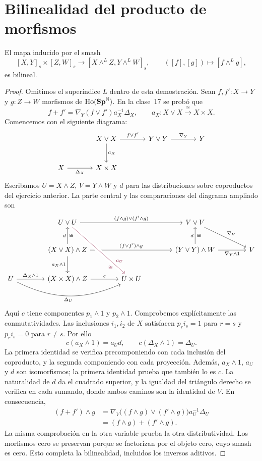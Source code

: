 \section{Bilinealidad del producto de morfismos}
\begin{prop}
El mapa inducido por el smash
\[
[X,Y]_s\times[Z,W]_s\longrightarrow[X\wedge^L Z,Y\wedge^L W]_s,
\qquad ([f],[g])\longmapsto[f\wedge^L g],
\]
es bilineal.
\end{prop}
\begin{proof}
Omitimos el superíndice $L$ dentro de esta demostración. Sean $f,f'\colon X\to Y$ y $g\colon Z\to W$ morfismos de $\operatorname{Ho}(\mathbf{Sp}^{\mathbb N})$. En la clase~17 se probó que
\[
f+f'=\nabla_Y(f\vee f')a_X^{-1}\Delta_X,
\qquad a_X\colon X\vee X\xrightarrow{\cong}X\times X.
\]
Comencemos con el siguiente diagrama:
\[
\begin{tikzcd}[column sep=large,row sep=large]
&X\vee X\arrow[r,"f\vee f'"]\arrow[d,"a_X"]&Y\vee Y\arrow[r,"\nabla_Y"]&Y\\
X\arrow[r,"\Delta_X"']&X\times X&&
\end{tikzcd}
\]
Escribamos $U=X\wedge Z$, $V=Y\wedge W$ y $d$ para las distribuciones sobre coproductos del ejercicio anterior. La parte central y las comparaciones del diagrama ampliado son
\[
\begin{tikzcd}[column sep=4em,row sep=2.4em]
&U\vee U\arrow[rr,"(f\wedge g)\vee(f'\wedge g)"]&&V\vee V\arrow[dr,"\nabla_V"]&\\
&(X\vee X)\wedge Z\arrow[u,"d","\cong"']\arrow[rr,"(f\vee f')\wedge g"]\arrow[d,"a_X\wedge1"']
&&(Y\vee Y)\wedge W\arrow[u,"d","\cong"']\arrow[r,"\nabla_Y\wedge1"']&V\\
U\arrow[r,"\Delta_X\wedge1"]\arrow[rr,bend right=25,"\Delta_U"']&(X\times X)\wedge Z\arrow[r,"c"]&U\times U&&
\arrow[from=1-2,to=3-3,rojoDiagramaCIMAT,"a_U"{pos=.8},"\cong"'{pos=.8},crossing over]
\end{tikzcd}
\]
Aquí $c$ tiene componentes $p_1\wedge1$ y $p_2\wedge1$. Comprobemos explícitamente las conmutatividades. Las inclusiones $i_1,i_2$ de $X$ satisfacen $p_ri_s=1$ para $r=s$ y $p_ri_s=0$ para $r\ne s$. Por ello
\[
c(a_X\wedge1)=a_Ud,
\qquad c(\Delta_X\wedge1)=\Delta_U.
\]
La primera identidad se verifica precomponiendo con cada inclusión del coproducto, y la segunda componiendo con cada proyección. Además, $a_X\wedge1$, $a_U$ y $d$ son isomorfismos; la primera identidad prueba que también lo es $c$. La naturalidad de $d$ da el cuadrado superior, y la igualdad del triángulo derecho se verifica en cada sumando, donde ambos caminos son la identidad de $V$. En consecuencia,
\[
\begin{aligned}
(f+f')\wedge g
&=\nabla_V\bigl((f\wedge g)\vee(f'\wedge g)\bigr)a_U^{-1}\Delta_U\\
&=(f\wedge g)+(f'\wedge g).
\end{aligned}
\]
La misma comprobación en la otra variable prueba la otra distributividad. Los morfismos cero se preservan porque se factorizan por el objeto cero, cuyo smash es cero. Esto completa la bilinealidad, incluidos los inversos aditivos.
\end{proof}

